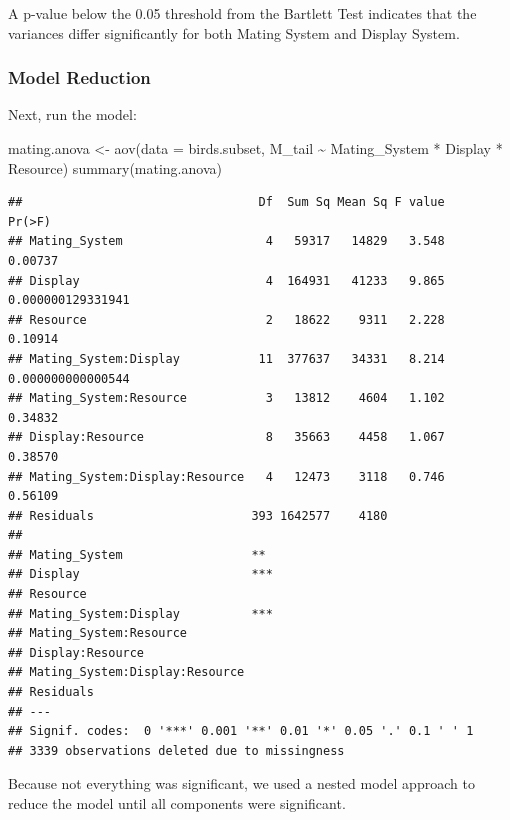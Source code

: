 \documentclass[
  12pt,
]{article}
\newenvironment{Shaded}{\begin{snugshade}}{\end{snugshade}}
\newcommand{\AttributeTok}[1]{\textcolor[rgb]{0.77,0.63,0.00}{#1}}
\newcommand{\FunctionTok}[1]{\textcolor[rgb]{0.00,0.00,0.00}{#1}}
\newcommand{\NormalTok}[1]{#1}
\newcommand{\OtherTok}[1]{\textcolor[rgb]{0.56,0.35,0.01}{#1}}
\newcommand{\SpecialCharTok}[1]{\textcolor[rgb]{0.00,0.00,0.00}{#1}}
\begin{document}
A p-value below the 0.05 threshold from the Bartlett Test indicates that
the variances differ significantly for both Mating System and Display
System.

\newpage

\hypertarget{model-reduction}{%
\subsubsection{Model Reduction}\label{model-reduction}}

Next, run the model:

\begin{Shaded}
\begin{Highlighting}[]
\NormalTok{mating.anova }\OtherTok{\textless{}{-}} \FunctionTok{aov}\NormalTok{(}\AttributeTok{data =}\NormalTok{ birds.subset, M\_tail }\SpecialCharTok{\textasciitilde{}}\NormalTok{ Mating\_System }\SpecialCharTok{*}\NormalTok{ Display }\SpecialCharTok{*}\NormalTok{ Resource)}
\FunctionTok{summary}\NormalTok{(mating.anova)}
\end{Highlighting}
\end{Shaded}

\begin{verbatim}
##                                 Df  Sum Sq Mean Sq F value            Pr(>F)
## Mating_System                    4   59317   14829   3.548           0.00737
## Display                          4  164931   41233   9.865 0.000000129331941
## Resource                         2   18622    9311   2.228           0.10914
## Mating_System:Display           11  377637   34331   8.214 0.000000000000544
## Mating_System:Resource           3   13812    4604   1.102           0.34832
## Display:Resource                 8   35663    4458   1.067           0.38570
## Mating_System:Display:Resource   4   12473    3118   0.746           0.56109
## Residuals                      393 1642577    4180                          
##                                   
## Mating_System                  ** 
## Display                        ***
## Resource                          
## Mating_System:Display          ***
## Mating_System:Resource            
## Display:Resource                  
## Mating_System:Display:Resource    
## Residuals                         
## ---
## Signif. codes:  0 '***' 0.001 '**' 0.01 '*' 0.05 '.' 0.1 ' ' 1
## 3339 observations deleted due to missingness
\end{verbatim}

Because not everything was significant, we used a nested model approach
to reduce the model until all components were significant.
\end{document}
